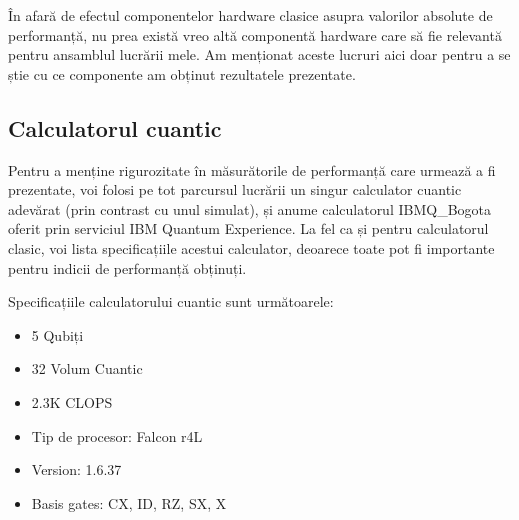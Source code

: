 În afară de efectul componentelor hardware clasice asupra valorilor absolute de performanță, nu prea există vreo altă componentă hardware care să fie relevantă pentru ansamblul lucrării mele. Am menționat aceste lucruri aici doar pentru a se știe cu ce componente am obținut rezultatele prezentate.

\pagebreak

\subsection{Calculatorul cuantic}
Pentru a menține rigurozitate în măsurătorile de performanță care urmează a fi prezentate, voi folosi pe tot parcursul lucrării un singur calculator cuantic adevărat (prin contrast cu unul simulat), și anume calculatorul IBMQ\_Bogota oferit prin serviciul IBM Quantum Experience. La fel ca și pentru calculatorul clasic, voi lista specificațiile acestui calculator, deoarece toate pot fi importante pentru indicii de performanță obținuți.

Specificațiile calculatorului cuantic sunt următoarele:
\begin{itemize}
    \item 5 Qubiți
    \item 32 Volum Cuantic
    \item 2.3K CLOPS
    \item Tip de procesor: Falcon r4L
    \item Version: 1.6.37
    \item Basis gates: CX, ID, RZ, SX, X
\end{itemize}

